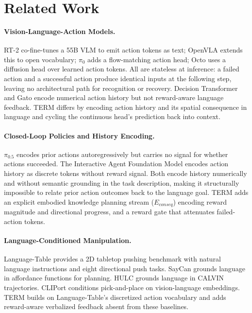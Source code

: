\documentclass[letterpaper]{article} %
\begin{document}
\section{Related Work}

\paragraph{Vision-Language-Action Models.}
RT-2 \cite{brohan2023rt2} co-fine-tunes a 55B VLM to emit action tokens as text; OpenVLA \cite{kim2024openvla} extends this to open vocabulary; $\pi_0$ \cite{black2024pi0} adds a flow-matching action head; Octo \cite{octo2024} uses a diffusion head over learned action tokens. All are stateless at inference: a failed action and a successful action produce identical inputs at the following step, leaving no architectural path for recognition or recovery. Decision Transformer \cite{chen2021decision} and Gato \cite{reed2022gato} encode numerical action history but not reward-aware language feedback. TERM differs by encoding action history and its spatial consequence in language and cycling the continuous head's prediction back into context.

\paragraph{Closed-Loop Policies and History Encoding.}
$\pi_{0.5}$ \cite{hejna2025pi05} encodes prior actions autoregressively but carries no signal for whether actions succeeded. The Interactive Agent Foundation Model \cite{durante2024agent} encodes action history as discrete tokens without reward signal. Both encode history numerically and without semantic grounding in the task description, making it structurally impossible to relate prior action outcomes back to the language goal. TERM adds an explicit embodied knowledge planning stream ($E_{conseq}$) encoding reward magnitude and directional progress, and a reward gate that attenuates failed-action tokens.

\paragraph{Language-Conditioned Manipulation.}
Language-Table \cite{lynch2023languagetable} provides a 2D tabletop pushing benchmark with natural language instructions and eight directional push tasks. SayCan \cite{ahn2022saycan} grounds language in affordance functions for planning. HULC \cite{mees2022hulc} grounds language in CALVIN trajectories. CLIPort \cite{shridhar2022cliport} conditions pick-and-place on vision-language embeddings. TERM builds on Language-Table's discretized action vocabulary and adds reward-aware verbalized feedback absent from these baselines.
\end{document}
